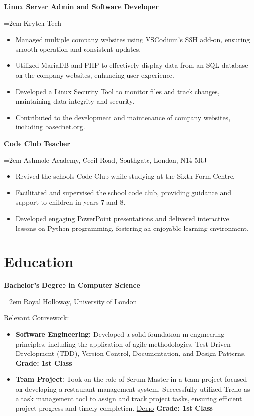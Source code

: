 \documentclass[12pt]{article} %
\newcommand{\sepspace}{\vspace*{1em}}
\newcommand{\education}[4]{
	
	
	\noindent  \textbf{#1}   
	
	
	\hfill      
	
	\framebox{%
		
		\parbox{6em}{%
			
			\centering\textbf{#2}}} \par  
	
	
	\noindent \textit{#3} \par        %
	
	\noindent\hangindent=2em\hangafter=0 \small #4  
	
	
	\normalsize \par}
\newcommand{\work}[4]{ 
	
	
	\noindent  \textbf{#1} 
	
	
	\hfill  
	
	\framebox{%
		
		\parbox{6em}{%
			
			\centering\textbf{#2}}} \par 
	
	
	\noindent \textit{#3} \par 
	
	
	\noindent\hangindent=2em\hangafter=0 \small #4
	
	
	\normalsize \par}
\begin{document}
	\work{Linux Server Admin and Software Developer}{2020-{}-2021}
	\sepspace
	{Kryten Tech}
	{
		\begin{itemize}      
			\item Managed multiple company websites using VSCodium's SSH add-on, ensuring smooth operation and consistent updates.    
			\item Utilized MariaDB and PHP to effectively display data from an SQL database on the company websites, enhancing user experience.    
			\item Developed a Linux Security Tool to monitor files and track changes, maintaining data integrity and security.	
			\item Contributed to the development and maintenance of company websites, including \href{https://github.com/Igluminati/basednet.org}{basednet.org}.
		\end{itemize}
	}
	
	\work{Code Club Teacher}{2019-{}-2020}
	\sepspace
	{Ashmole Academy, Cecil Road, Southgate, London, N14 5RJ}
	{
		\begin{itemize}
			\item Revived the schools Code Club while studying at the Sixth Form Centre.
			\item Facilitated and supervised the school code club, providing guidance and support to children in years 7 and 8.
			\item Developed engaging PowerPoint presentations and delivered interactive lessons on Python programming, fostering an enjoyable learning environment.
		\end{itemize}
	}
			
	
	
	\section*{Education}
	
	\education{Bachelor's Degree in Computer Science}{2020-2024}
	\sepspace{Royal Holloway, University of London}
	{
		\sepspace
		Relevant Coursework:
		
		\begin{itemize}
			\item\textbf{Software Engineering:} Developed a solid foundation in engineering principles, including the application of agile methodologies, Test Driven Development (TDD), Version Control, Documentation, and Design Patterns.
			\textbf{Grade: 1st Class}
			\item\textbf{Team Project:} Took on the role of Scrum Master in a team project focused on developing a restaurant management system. Successfully utilized Trello as a task management tool to assign and track project tasks, ensuring efficient project progress and timely completion.
			\href{https://www.youtube.com/watch?v=PpJfEVGBtPg}{Demo}
			\textbf{Grade: 1st Class}
		\end{itemize}
	}
	
\end{document}

